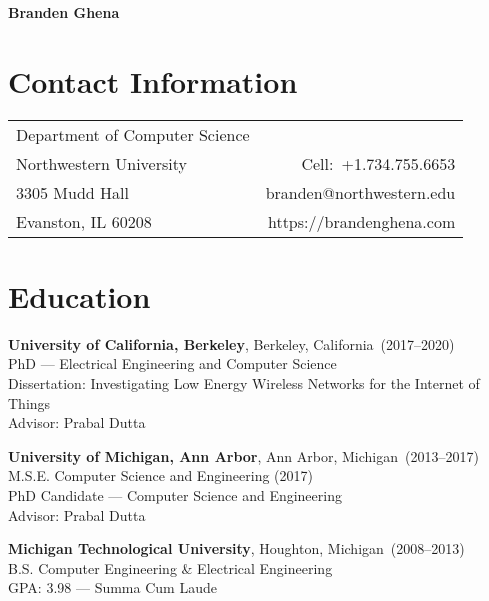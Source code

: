 \documentclass{article}
\begin{document}

\nocite{*}

\begin{center}
    \Huge{\bf{Branden Ghena}}
\end{center}

\section*{Contact Information}

\begin{table}[H]
\centering
\vspace*{-16pt}
\begin{tabularx}{\linewidth}{@{} X r @{}}
    {Department of Computer Science}     & {} \\
    {Northwestern University}   & {Cell:~+1.734.755.6653} \\
    {3305 Mudd Hall} & {branden@northwestern.edu} \\
    {Evanston, IL 60208} & {https://brandenghena.com} \\
\end{tabularx}
\end{table}


\section*{Education}
\vspace{-6pt}

{\bf University of California, Berkeley}, Berkeley, California~(2017--2020) \\
PhD --- Electrical Engineering and Computer Science \\
Dissertation: Investigating Low Energy Wireless Networks for the Internet of Things \\
Advisor: Prabal Dutta

{\bf University of Michigan, Ann Arbor}, Ann Arbor, Michigan~(2013--2017) \\
M.S.E. Computer Science and Engineering (2017) \\
PhD Candidate --- Computer Science and Engineering \\
Advisor: Prabal Dutta

{\bf Michigan Technological University}, Houghton, Michigan~(2008--2013) \\
B.S. Computer Engineering \& Electrical Engineering \\
GPA: 3.98 --- Summa Cum Laude
\end{document}
